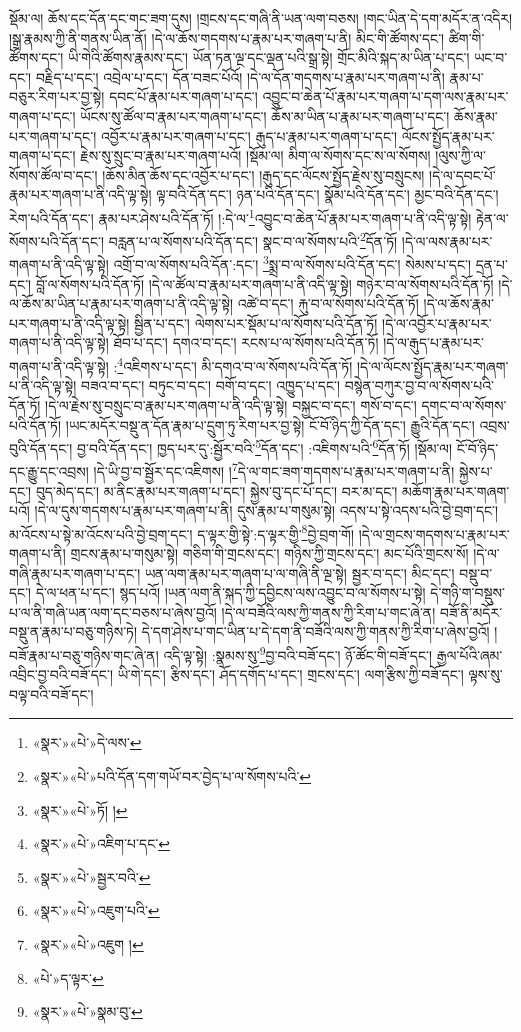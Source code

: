 སྡོམ་ལ། ཆོས་དང་དོན་དང་གང་ཟག་དུས། །གྲངས་དང་གཞི་ནི་ཡན་ལག་བཅས། །གང་ཡིན་དེ་དག་མདོར་ན་འདིར། །སྒྲ་རྣམས་ཀྱི་ནི་གནས་ཡིན་ནོ། །དེ་ལ་ཆོས་གདགས་པ་རྣམ་པར་གཞག་པ་ནི། མིང་གི་ཚོགས་དང་། ཚིག་གི་ཚོགས་དང་། ཡི་གེའི་ཚོགས་རྣམས་དང་། ཡོན་ཏན་ལྔ་དང་ལྡན་པའི་སྒྲ་སྟེ། གྲོང་མིའི་སྐད་མ་ཡིན་པ་དང་། ཡང་བ་དང་། བརྗིད་པ་དང་། འབྲེལ་པ་དང་། དོན་བཟང་པོའོ། །དེ་ལ་དོན་གདགས་པ་རྣམ་པར་གཞག་པ་ནི། རྣམ་པ་བཅུར་རིག་པར་བྱ་སྟེ། དབང་པོ་རྣམ་པར་གཞག་པ་དང་། འབྱུང་བ་ཆེན་པོ་རྣམ་པར་གཞག་པ་དག་ལས་རྣམ་པར་གཞག་པ་དང་། ཡོངས་སུ་ཚོལ་བ་རྣམ་པར་གཞག་པ་དང་། ཆོས་མ་ཡིན་པ་རྣམ་པར་གཞག་པ་དང་། ཆོས་རྣམ་པར་གཞག་པ་དང་། འབྱོར་པ་རྣམ་པར་གཞག་པ་དང་། རྒུད་པ་རྣམ་པར་གཞག་པ་དང་། ལོངས་སྤྱོད་རྣམ་པར་གཞག་པ་དང་། རྗེས་སུ་སྲུང་བ་རྣམ་པར་གཞག་པའོ། །སྡོམ་ལ། མིག་ལ་སོགས་དང་ས་ལ་སོགས། །ལུས་ཀྱི་ལ་སོགས་ཚོལ་བ་དང་། །ཆོས་མིན་ཆོས་དང་འབྱོར་པ་དང་། །རྒུད་དང་ལོངས་སྤྱོད་རྗེས་སུ་བསྲུངས། །དེ་ལ་དབང་པོ་རྣམ་པར་གཞག་པ་ནི་འདི་ལྟ་སྟེ། ལྟ་བའི་དོན་དང་། ཉན་པའི་དོན་དང་། སྣོམ་པའི་དོན་དང་། མྱང་བའི་དོན་དང་། རེག་པའི་དོན་དང་། རྣམ་པར་ཤེས་པའི་དོན་ཏོ། །:དེ་ལ་\footnote{«སྣར་»«པེ་»དེ་ལས་}འབྱུང་བ་ཆེན་པོ་རྣམ་པར་གཞག་པ་ནི་འདི་ལྟ་སྟེ། རྟེན་ལ་སོགས་པའི་དོན་དང་། བརླན་པ་ལ་སོགས་པའི་དོན་དང་། སྣང་བ་ལ་སོགས་པའི་\footnote{«སྣར་»«པེ་»པའི་དོན་དག་གཡོ་བར་བྱེད་པ་ལ་སོགས་པའི་}དོན་ཏོ། །དེ་ལ་ལས་རྣམ་པར་གཞག་པ་ནི་འདི་ལྟ་སྟེ། འགྲོ་བ་ལ་སོགས་པའི་དོན་:དང་། \footnote{«སྣར་»«པེ་»ཏོ། ། }སྨྲ་བ་ལ་སོགས་པའི་དོན་དང་། སེམས་པ་དང་། དྲན་པ་དང་། བློ་ལ་སོགས་པའི་དོན་ཏོ། །དེ་ལ་ཚོལ་བ་རྣམ་པར་གཞག་པ་ནི་འདི་ལྟ་སྟེ། གཉེར་བ་ལ་སོགས་པའི་དོན་ཏོ། །དེ་ལ་ཆོས་མ་ཡིན་པ་རྣམ་པར་གཞག་པ་ནི་འདི་ལྟ་སྟེ། འཚེ་བ་དང་། རྐུ་བ་ལ་སོགས་པའི་དོན་ཏོ། །དེ་ལ་ཆོས་རྣམ་པར་གཞག་པ་ནི་འདི་ལྟ་སྟེ། སྦྱིན་པ་དང་། ལེགས་པར་སྡོམ་པ་ལ་སོགས་པའི་དོན་ཏོ། །དེ་ལ་འབྱོར་པ་རྣམ་པར་གཞག་པ་ནི་འདི་ལྟ་སྟེ། ཐོབ་པ་དང་། དགའ་བ་དང་། རངས་པ་ལ་སོགས་པའི་དོན་ཏོ། །དེ་ལ་རྒུད་པ་རྣམ་པར་གཞག་པ་ནི་འདི་ལྟ་སྟེ། :\footnote{«སྣར་»«པེ་»འཇིག་པ་དང་}འཇིགས་པ་དང་། མི་དགའ་བ་ལ་སོགས་པའི་དོན་ཏོ། །དེ་ལ་ལོངས་སྤྱོད་རྣམ་པར་གཞག་པ་ནི་འདི་ལྟ་སྟེ། བཟའ་བ་དང་། བཏུང་བ་དང་། བགོ་བ་དང་། འཁྱུད་པ་དང་། བསྙེན་བཀུར་བྱ་བ་ལ་སོགས་པའི་དོན་ཏོ། །དེ་ལ་རྗེས་སུ་བསྲུང་བ་རྣམ་པར་གཞག་པ་ནི་འདི་ལྟ་སྟེ། བསྐྱང་བ་དང་། གསོ་བ་དང་། དགང་བ་ལ་སོགས་པའི་དོན་ཏོ། །ཡང་མདོར་བསྡུ་ན་དོན་རྣམ་པ་དྲུག་ཏུ་རིག་པར་བྱ་སྟེ། ངོ་བོ་ཉིད་ཀྱི་དོན་དང་། རྒྱུའི་དོན་དང་། འབྲས་བུའི་དོན་དང་། བྱ་བའི་དོན་དང་། ཁྱད་པར་དུ་:སྦྱོར་བའི་\footnote{«སྣར་»«པེ་»སྦྱར་བའི་}དོན་དང་། :འཇིགས་པའི་\footnote{«སྣར་»«པེ་»འཇུག་པའི་}དོན་ཏོ། །སྡོམ་ལ། ངོ་བོ་ཉིད་དང་རྒྱུ་དང་འབྲས། །དེ་ཡི་བྱ་བ་སྦྱོར་དང་འཇིགས། །\footnote{«སྣར་»«པེ་»འཇུག །}དེ་ལ་གང་ཟག་གདགས་པ་རྣམ་པར་གཞག་པ་ནི། སྐྱེས་པ་དང་། བུད་མེད་དང་། མ་ནིང་རྣམ་པར་གཞག་པ་དང་། སྐྱེས་བུ་དང་པོ་དང་། བར་མ་དང་། མཆོག་རྣམ་པར་གཞག་པའོ། །དེ་ལ་དུས་གདགས་པ་རྣམ་པར་གཞག་པ་ནི། དུས་རྣམ་པ་གསུམ་སྟེ། འདས་པ་སྟེ་འདས་པའི་བྱེ་བྲག་དང་། མ་འོངས་པ་སྟེ་མ་འོངས་པའི་བྱེ་བྲག་དང་། ད་ལྟར་གྱི་སྟེ་:ད་ལྟར་གྱི་\footnote{«པེ་»ད་ལྟར་}བྱེ་བྲག་གོ། །དེ་ལ་གྲངས་གདགས་པ་རྣམ་པར་གཞག་པ་ནི། གྲངས་རྣམ་པ་གསུམ་སྟེ། གཅིག་གི་གྲངས་དང་། གཉིས་ཀྱི་གྲངས་དང་། མང་པོའི་གྲངས་སོ། །དེ་ལ་གཞི་རྣམ་པར་གཞག་པ་དང་། ཡན་ལག་རྣམ་པར་གཞག་པ་ལ་གཞི་ནི་ལྔ་སྟེ། སྦྱར་བ་དང་། མིང་དང་། བསྡུ་བ་དང་། དེ་ལ་ཕན་པ་དང་། སྙད་པའོ། །ཡན་ལག་ནི་སྐད་ཀྱི་དབྱིངས་ལས་འབྱུང་བ་ལ་སོགས་པ་སྟེ། དེ་གཉི་ག་བསྡུས་པ་ལ་ནི་གཞི་ཡན་ལག་དང་བཅས་པ་ཞེས་བྱའོ། །དེ་ལ་བཟོའི་ལས་ཀྱི་གནས་ཀྱི་རིག་པ་གང་ཞེ་ན། བཟོ་ནི་མདོར་བསྡུ་ན་རྣམ་པ་བཅུ་གཉིས་ཏེ། དེ་དག་ཤེས་པ་གང་ཡིན་པ་དེ་དག་ནི་བཟོའི་ལས་ཀྱི་གནས་ཀྱི་རིག་པ་ཞེས་བྱའོ། །བཟོ་རྣམ་པ་བཅུ་གཉིས་གང་ཞེ་ན། འདི་ལྟ་སྟེ། :སྣམས་སུ་\footnote{«སྣར་»«པེ་»སྣམ་བུ་}བྱ་བའི་བཟོ་དང་། ཉོ་ཚོང་གི་བཟོ་དང་། རྒྱལ་པོའི་ཞམ་འབྲིང་བྱ་བའི་བཟོ་དང་། ཡི་གེ་དང་། རྩིས་དང་། ཤོད་དགོད་པ་དང་། གྲངས་དང་། ལག་རྩིས་ཀྱི་བཟོ་དང་། ལྟས་སུ་བལྟ་བའི་བཟོ་དང་། 